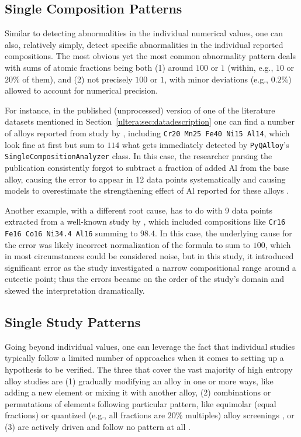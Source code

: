 \subsection{Single Composition Patterns} \label{pyqalloy:ssec:singlecomp}

Similar to detecting abnormalities in the individual numerical values, one can also, relatively simply, detect specific abnormalities in the individual reported compositions. The most obvious yet the most common abnormality pattern deals with sums of atomic fractions being both (1) around $100$ or $1$ (within, e.g., $10$ or $20\%$ of them), and (2) not precisely $100$ or $1$, with minor deviations (e.g., $0.2\%$) allowed to account for numerical precision.

For instance, in the published (unprocessed) version of one of the literature datasets mentioned in Section~\ref{ultera:sec:datadescription} one can find a number of alloys reported from study by \citet{Stepanov2019EffectContent}, including \texttt{Cr20 Mn25 Fe40 Ni15 Al14}, which look fine at first but sum to $114$ what gets immediately detected by \texttt{PyQAlloy}'s \texttt{SingleCompositionAnalyzer} class. In this case, the researcher parsing the publication consistently forgot to subtract a fraction of added Al from the base alloy, causing the error to appear in 12 data points systematically and causing models to overestimate the strengthening effect of Al reported for these alloys \cite{Stepanov2019EffectContent}.

Another example, with a different root cause, has to do with 9 data points extracted from a well-known study by \citet{Lu2017DirectlyRange}, which included compositions like \texttt{Cr16 Fe16 Co16 Ni34.4 Al16} summing to $98.4$. In this case, the underlying cause for the error was likely incorrect normalization of the formula to sum to $100$, which in most circumstances could be considered noise, but in this study, it introduced significant error as the study investigated a narrow compositional range around a eutectic point; thus the errors became on the order of the study's domain and skewed the interpretation dramatically.


\subsection{Single Study Patterns}   \label{pyqalloy:ssec:singlestudy}

Going beyond individual values, one can leverage the fact that individual studies typically follow a limited number of approaches when it comes to setting up a hypothesis to be verified. The three that cover the vast majority of high entropy alloy studies are (1) gradually modifying an alloy in one or more ways, like adding a new element or mixing it with another alloy, (2) combinations or permutations of elements following particular pattern, like equimolar (equal fractions) or quantized (e.g., all fractions are $20\%$ multiples) alloy screenings \cite{Elder2023ComputationalDown-selection, Elder2023ComputationalValidation}, or (3) are actively driven and follow no pattern at all \cite{Rao2022MachineDiscovery}. 


